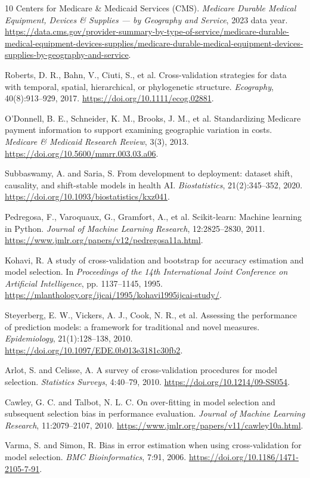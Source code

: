 \begin{thebibliography}{10}
Centers for Medicare \& Medicaid Services (CMS). \emph{Medicare Durable Medical Equipment, Devices \& Supplies --- by Geography and Service}, 2023 data year. \url{https://data.cms.gov/provider-summary-by-type-of-service/medicare-durable-medical-equipment-devices-supplies/medicare-durable-medical-equipment-devices-supplies-by-geography-and-service}.

Roberts, D. R., Bahn, V., Ciuti, S., et al. Cross-validation strategies for data with temporal, spatial, hierarchical, or phylogenetic structure. \emph{Ecography}, 40(8):913--929, 2017. \url{https://doi.org/10.1111/ecog.02881}.

O'Donnell, B. E., Schneider, K. M., Brooks, J. M., et al. Standardizing Medicare payment information to support examining geographic variation in costs. \emph{Medicare \& Medicaid Research Review}, 3(3), 2013. \url{https://doi.org/10.5600/mmrr.003.03.a06}.

Subbaswamy, A. and Saria, S. From development to deployment: dataset shift, causality, and shift-stable models in health AI. \emph{Biostatistics}, 21(2):345--352, 2020. \url{https://doi.org/10.1093/biostatistics/kxz041}.

Pedregosa, F., Varoquaux, G., Gramfort, A., et al. Scikit-learn: Machine learning in Python. \emph{Journal of Machine Learning Research}, 12:2825--2830, 2011. \url{https://www.jmlr.org/papers/v12/pedregosa11a.html}.

Kohavi, R. A study of cross-validation and bootstrap for accuracy estimation and model selection. In \emph{Proceedings of the 14th International Joint Conference on Artificial Intelligence}, pp. 1137--1145, 1995. \url{https://mlanthology.org/ijcai/1995/kohavi1995ijcai-study/}.

Steyerberg, E. W., Vickers, A. J., Cook, N. R., et al. Assessing the performance of prediction models: a framework for traditional and novel measures. \emph{Epidemiology}, 21(1):128--138, 2010. \url{https://doi.org/10.1097/EDE.0b013e3181c30fb2}.

Arlot, S. and Celisse, A. A survey of cross-validation procedures for model selection. \emph{Statistics Surveys}, 4:40--79, 2010. \url{https://doi.org/10.1214/09-SS054}.

Cawley, G. C. and Talbot, N. L. C. On over-fitting in model selection and subsequent selection bias in performance evaluation. \emph{Journal of Machine Learning Research}, 11:2079--2107, 2010. \url{https://www.jmlr.org/papers/v11/cawley10a.html}.

Varma, S. and Simon, R. Bias in error estimation when using cross-validation for model selection. \emph{BMC Bioinformatics}, 7:91, 2006. \url{https://doi.org/10.1186/1471-2105-7-91}.

\end{thebibliography}
